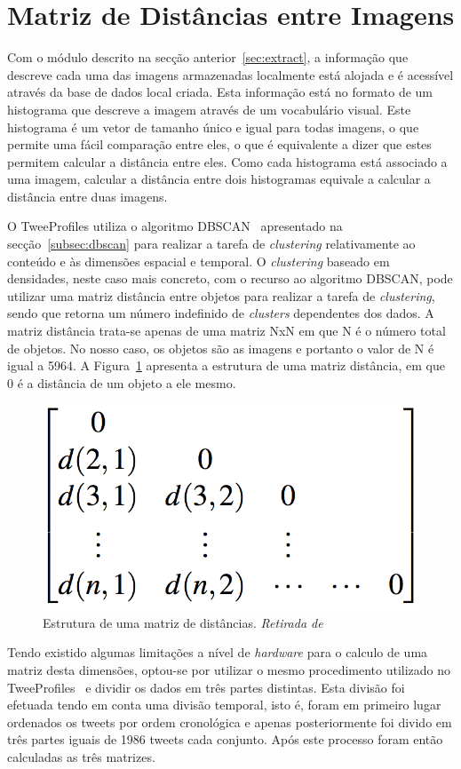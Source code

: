 \section{Matriz de Distâncias entre Imagens}

Com o módulo descrito na secção anterior~\ref{sec:extract}, a informação que descreve cada uma das imagens armazenadas localmente está alojada e é acessível através da base de dados local criada. Esta informação está no formato de um histograma que descreve a imagem através de um vocabulário visual. Este histograma é um vetor de tamanho único e igual para todas imagens, o que permite uma fácil comparação entre eles, o que é equivalente a dizer que estes permitem calcular a distância entre eles. Como cada histograma está associado a uma imagem, calcular a distância entre dois histogramas equivale a calcular a distância entre duas imagens.

O TweeProfiles utiliza o algoritmo DBSCAN~\cite{Han2006} apresentado na secção~\ref{subsec:dbscan} para realizar a tarefa de \textit{clustering} relativamente ao conteúdo e às dimensões espacial e temporal. O \textit{clustering} baseado em densidades, neste caso mais concreto, com o recurso ao algoritmo DBSCAN, pode utilizar uma matriz distância entre objetos para realizar a tarefa de \textit{clustering}, sendo que retorna um número indefinido de \textit{clusters} dependentes dos dados. A matriz distância trata-se apenas de uma matriz NxN em que N é o número total de objetos. No nosso caso, os objetos são as imagens e portanto o valor de N é igual a 5964. A Figura~\ref{fig:matriz} apresenta a estrutura de uma matriz distância, em que 0 é a distância de um objeto a ele mesmo.

\begin{figure}[h]
\centering
\includegraphics[width=0.3\linewidth]{./figures/matrizdist}
\caption{Estrutura de uma matriz de distâncias. \textit{Retirada de}~\cite{Han2006}}
\label{fig:matriz}
\end{figure}

Tendo existido algumas limitações a nível de \textit{hardware} para o calculo de uma matriz desta dimensões, optou-se por utilizar o mesmo procedimento utilizado no TweeProfiles~\cite{Cunha2013} e dividir os dados em três partes distintas. Esta divisão foi efetuada tendo em conta uma divisão temporal, isto é, foram em primeiro lugar ordenados os tweets por ordem cronológica e apenas posteriormente foi divido em três partes iguais de 1986 tweets cada conjunto. Após este processo foram então calculadas as três matrizes.
 
